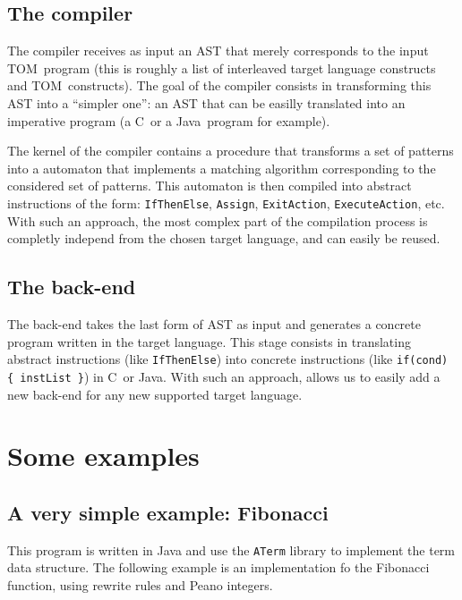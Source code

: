 \documentclass[a4paper]{article}
\newcommand{\TOM}{\textsf{TOM}}
\newcommand{\C}{\textsf{C}}
\newcommand{\Java}{\textsf{Java}}
\begin{document}
\subsection{The compiler}
The compiler receives as input an AST that merely corresponds to the 
input \TOM\ program (this is roughly a list of interleaved target
language constructs and \TOM\ constructs).
The goal of the compiler consists in transforming this AST into a
``simpler one'': an AST that can be easilly translated into an
imperative program (a \C\ or a \Java\ program for example).

The kernel of the compiler contains a procedure that transforms a set
of patterns into a automaton that implements a matching algorithm
corresponding to the considered set of patterns. 
This automaton is then compiled into abstract instructions of the
form: \texttt{IfThenElse}, \texttt{Assign}, \texttt{ExitAction}, 
\texttt{ExecuteAction}, etc. 
With such an approach, the most complex part of the compilation process
is completly independ from the chosen target language, and can easily
be reused.


\subsection{The back-end}
The back-end takes the last form of AST as input and generates a
concrete program written in the target language. This stage consists
in translating abstract instructions (like \texttt{IfThenElse}) into
concrete instructions (like \texttt{if(cond) \{ instList \}}) in \C\
or \Java.  
With such an approach, allows us to easily add a new back-end for any 
new supported target language.



\section{Some examples}

\subsection{A very simple example: Fibonacci}
This program is written in Java and use the \texttt{ATerm} library to
implement the term data structure.
The following example is an implementation fo the Fibonacci function,
using rewrite rules and Peano integers.
\end{document}
